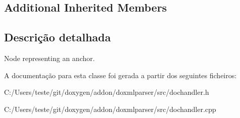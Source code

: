 \subsection*{Additional Inherited Members}


\subsection{Descrição detalhada}
Node representing an anchor. 



A documentação para esta classe foi gerada a partir dos seguintes ficheiros\-:\begin{DoxyCompactItemize}
\item 
C\-:/\-Users/teste/git/doxygen/addon/doxmlparser/src/dochandler.\-h\item 
C\-:/\-Users/teste/git/doxygen/addon/doxmlparser/src/dochandler.\-cpp\end{DoxyCompactItemize}
